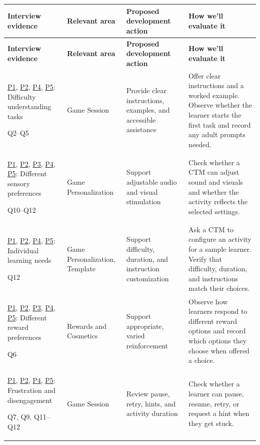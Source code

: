 \documentclass[12pt, titlepage]{article}
\begin{document}
\begin{longtable}{|p{}|p{}|p{}|p{}|}
\hline
\textbf{Interview evidence} & \textbf{Relevant area} & \textbf{Proposed development action} & \textbf{How we'll evaluate it} \\ \hline
\endfirsthead
\hline \textbf{Interview evidence} & \textbf{Relevant area} & \textbf{Proposed development action} & \textbf{How we'll evaluate it} \\ \hline
\endhead
\hyperref[app:participant-1]{P1}, \hyperref[app:participant-2]{P2}, \hyperref[app:participant-4]{P4}, \hyperref[app:participant-5]{P5}: Difficulty understanding tasks\par {\small Q2--Q5} & Game Session & Provide clear instructions, examples, and accessible assistance & Offer clear instructions and a worked example. Observe whether the learner starts the first task and record any adult prompts needed. \\ \hline
\hyperref[app:participant-1]{P1}, \hyperref[app:participant-2]{P2}, \hyperref[app:participant-3]{P3}, \hyperref[app:participant-4]{P4}, \hyperref[app:participant-5]{P5}: Different sensory preferences\par {\small Q10--Q12} & Game Personalization & Support adjustable audio and visual stimulation & Check whether a CTM can adjust sound and visuals and whether the activity reflects the selected settings. \\ \hline
\hyperref[app:participant-1]{P1}, \hyperref[app:participant-2]{P2}, \hyperref[app:participant-4]{P4}, \hyperref[app:participant-5]{P5}: Individual learning needs\par {\small Q12} & Game Personalization, Template & Support difficulty, duration, and instruction customization & Ask a CTM to configure an activity for a sample learner. Verify that difficulty, duration, and instructions match their choices. \\ \hline
\hyperref[app:participant-1]{P1}, \hyperref[app:participant-2]{P2}, \hyperref[app:participant-3]{P3}, \hyperref[app:participant-4]{P4}, \hyperref[app:participant-5]{P5}: Different reward preferences\par {\small Q6} & Rewards and Cosmetics & Support appropriate, varied reinforcement & Observe how learners respond to different reward options and record which options they choose when offered a choice. \\ \hline
\hyperref[app:participant-1]{P1}, \hyperref[app:participant-2]{P2}, \hyperref[app:participant-4]{P4}, \hyperref[app:participant-5]{P5}: Frustration and disengagement\par {\small Q7, Q9, Q11--Q12} & Game Session & Review pause, retry, hints, and activity duration & Check whether a learner can pause, resume, retry, or request a hint when they get stuck. \\ \hline

\end{longtable}
\end{document}
